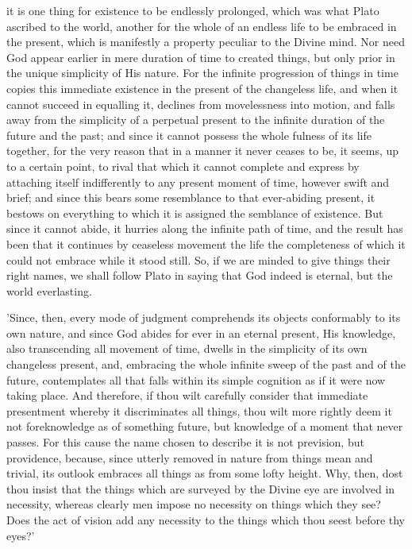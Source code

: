 it is one thing for existence to be endlessly prolonged, which was what
Plato ascribed to the world, another for the whole of an endless life to
be embraced in the present, which is manifestly a property peculiar to
the Divine mind. Nor need God appear earlier in mere duration of time to
created things, but only prior in the unique simplicity of His nature.
For the infinite progression of things in time copies this immediate
existence in the present of the changeless life, and when it cannot
succeed in equalling it, declines from movelessness into motion, and
falls away from the simplicity of a perpetual present to the infinite
duration of the future and the past; and since it cannot possess the
whole fulness of its life together, for the very reason that in a manner
it never ceases to be, it seems, up to a certain point, to rival that
which it cannot complete and express by attaching itself indifferently
to any present moment of time, however swift and brief; and since this
bears some resemblance to that ever-abiding present, it bestows on
everything to which it is assigned the semblance of existence. But since
it cannot abide, it hurries along the infinite path of time, and the
result has been that it continues by ceaseless movement the life the
completeness of which it could not embrace while it stood still. So, if
we are minded to give things their right names, we shall follow Plato in
saying that God indeed is eternal, but the world everlasting.

'Since, then, every mode of judgment comprehends its objects conformably
to its own nature, and since God abides for ever in an eternal present,
His knowledge, also transcending all movement of time, dwells in the
simplicity of its own changeless present, and, embracing the whole
infinite sweep of the past and of the future, contemplates all that
falls within its simple cognition as if it were now taking place. And
therefore, if thou wilt carefully consider that immediate presentment
whereby it discriminates all things, thou wilt more rightly deem it not
foreknowledge as of something future, but knowledge of a moment that
never passes. For this cause the name chosen to describe it is not
prevision, but providence, because, since utterly removed in nature from
things mean and trivial, its outlook embraces all things as from some
lofty height. Why, then, dost thou insist that the things which are
surveyed by the Divine eye are involved in necessity, whereas clearly
men impose no necessity on things which they see? Does the act of vision
add any necessity to the things which thou seest before thy eyes?'

